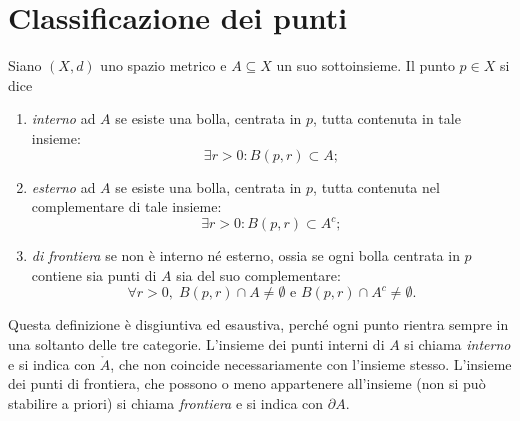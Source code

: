 \section{Classificazione dei punti}
\begin{definizione}
Siano $(X,d)$ uno spazio metrico e $A\subseteq X$ un suo sottoinsieme. Il punto $p\in X$ si dice
\begin{enumerate}
\item \emph{interno} ad $A$ se esiste una bolla, centrata in $p$, tutta contenuta in tale insieme:
\[
\exists r>0\colon B(p,r)\subset A;
\]
\item \emph{esterno} ad $A$ se esiste una bolla, centrata in $p$, tutta contenuta nel complementare di tale insieme:
\[
\exists r>0\colon B(p,r)\subset A^c;
\]
\item \emph{di frontiera} se non è interno né esterno, ossia se ogni bolla centrata in $p$ contiene sia punti di $A$ sia del suo complementare:
\[
\forall r>0,\;B(p,r)\cap A\neq\emptyset\text{ e }B(p,r)\cap A^c\neq\emptyset.
\]
\end{enumerate}
\end{definizione}
Questa definizione è disgiuntiva ed esaustiva, perché ogni punto rientra sempre in una soltanto delle tre categorie.
L'insieme dei punti interni di $A$ si chiama \emph{interno} e si indica con $\mathring A$, che non coincide necessariamente con l'insieme stesso. L'insieme dei punti di frontiera, che possono o meno appartenere all'insieme (non si può stabilire a priori) si chiama \emph{frontiera} e si indica con $\partial A$.
